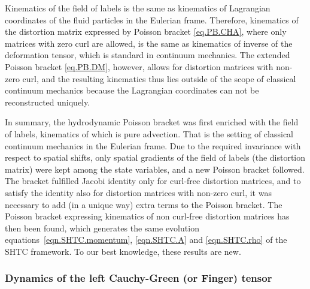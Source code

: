 \documentclass[twoside]{article}
\newcommand{\IP}[1]{ \textcolor{blue}   {\small\texttt{
\texttt{[image: pin\_small.jpeg]} Ilya: #1}} }
\newcommand{\MP}[1]{ \textcolor{Green}   {\small\texttt{
\texttt{[image: pin\_small.jpeg]} Michal: #1}} }
\begin{document}
Kinematics of the field of labels is the same as kinematics of 
Lagrangian coordinates of the fluid particles in the Eulerian frame. Therefore, 
kinematics of the distortion matrix expressed by Poisson bracket 
\eqref{eq.PB.CHA}, where only matrices with zero curl are allowed, is the same 
as kinematics of inverse of the deformation tensor, which is standard in 
continuum mechanics. The extended Poisson bracket \eqref{eq.PB.DM}, however, 
allows for distortion matrices with non-zero curl, and the resulting kinematics 
thus lies outside of the scope of classical continuum mechanics because the 
Lagrangian coordinates can not be reconstructed uniquely.

In summary, the hydrodynamic Poisson bracket was first enriched with the field 
of labels, kinematics of which is pure advection. That is the setting of 
classical continuum mechanics in the Eulerian frame. Due to the required 
invariance with respect to spatial shifts, only spatial gradients of the field of 
labels (the distortion matrix) were kept among the state variables, and a new 
Poisson bracket followed. The bracket fulfilled Jacobi identity only for 
curl-free distortion matrices, and to satisfy the identity also for distortion 
matrices with non-zero curl, it was necessary to add (in a unique way) extra 
terms to the Poisson bracket. The Poisson bracket expressing kinematics of non 
curl-free distortion matrices has then been found, which generates the same 
evolution equations~\eqref{eqn.SHTC.momentum}, 
\eqref{eqn.SHTC.A} and \eqref{eqn.SHTC.rho} of the SHTC framework.
To our best knowledge, these results are new.



\subsubsection{Dynamics of the left Cauchy-Green (or Finger) tensor}\label{sec.B}

\end{document}
